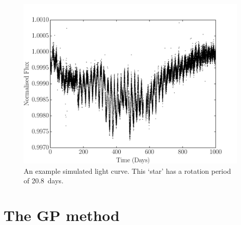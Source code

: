 \documentclass[useAMS, usenatbib, preprint, 12pt]{aastex}
\newcommand{\naigrain}{333}
\newcommand{\aigrainexampleperiod}{20.8}
\begin{document}
\begin{figure}
\begin{center}
\includegraphics[width=6in, clip=true]{figures/demo_lc.pdf}
\caption[A simulated light curve.]
{An example simulated light curve. This `star' has a rotation period of
\aigrainexampleperiod\ days.}
\label{fig:demo_lc}
\end{center}
\end{figure}


\section{The GP method}
\label{sec:method}
\end{document}
